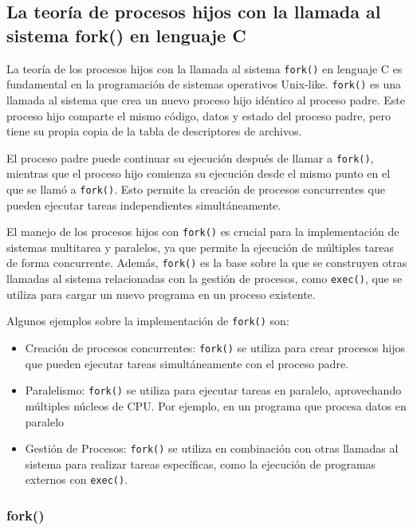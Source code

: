 \subsection{La teoría de procesos hijos con la llamada al sistema fork() en lenguaje C}

La teoría de los procesos hijos con la llamada al sistema \texttt{fork()} en lenguaje C es fundamental en la programación de sistemas operativos Unix-like. \texttt{fork()} es una llamada al sistema que crea un nuevo proceso hijo idéntico al proceso padre. Este proceso hijo comparte el mismo código, datos y estado del proceso padre, pero tiene su propia copia de la tabla de descriptores de archivos.

El proceso padre puede continuar su ejecución después de llamar a \texttt{fork()}, mientras que el proceso hijo comienza su ejecución desde el mismo punto en el que se llamó a \texttt{fork()}. Esto permite la creación de procesos concurrentes que pueden ejecutar tareas independientes simultáneamente.\cite*{isola-programacion-concurrente-c-2019}

El manejo de los procesos hijos con \texttt{fork()} es crucial para la implementación de sistemas multitarea y paralelos, ya que permite la ejecución de múltiples tareas de forma concurrente. Además, \texttt{fork()} es la base sobre la que se construyen otras llamadas al sistema relacionadas con la gestión de procesos, como \texttt{exec()}, que se utiliza para cargar un nuevo programa en un proceso existente.

Algunos ejemplos sobre la implementación de \texttt{fork()} son:

\begin{itemize}
	\item   Creación de procesos concurrentes: \texttt{fork()} se utiliza para crear procesos hijos que pueden ejecutar tareas simultáneamente con el   proceso padre.
	\item   Paralelismo: \texttt{fork()} se utiliza para ejecutar tareas en paralelo,   aprovechando múltiples núcleos de CPU. Por ejemplo, en un programa que   procesa datos en paralelo
	\item   Gestión de Procesos: \texttt{fork()} se utiliza en combinación con otras   llamadas al sistema para realizar tareas específicas, como la   ejecución de programas externos con \texttt{exec()}.
\end{itemize}

\subsubsection{fork()}


